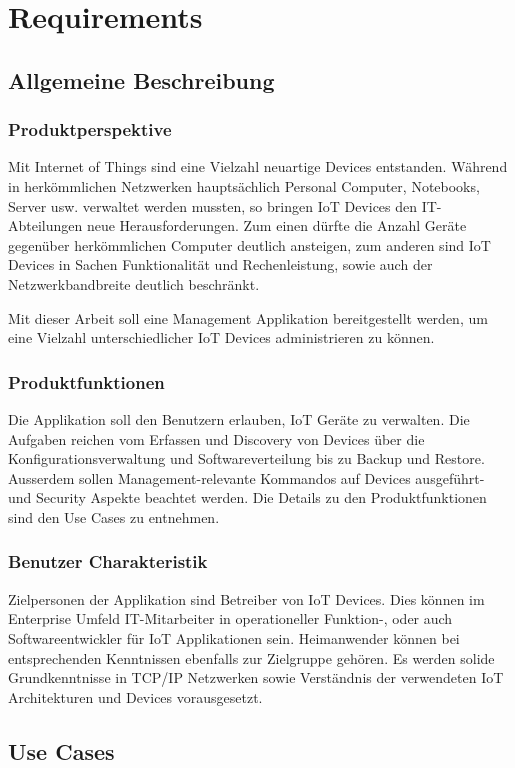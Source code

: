 \chapter{Requirements}
\section{Allgemeine Beschreibung}
\subsection{Produktperspektive}
Mit Internet of Things sind eine Vielzahl neuartige Devices entstanden. Während in herkömmlichen Netzwerken hauptsächlich Personal Computer, Notebooks, Server usw. verwaltet werden mussten, so bringen IoT Devices den IT-Abteilungen neue Herausforderungen. Zum einen dürfte die Anzahl Geräte gegenüber herkömmlichen Computer deutlich ansteigen, zum anderen sind IoT Devices in Sachen Funktionalität und Rechenleistung, sowie auch der Netzwerkbandbreite deutlich beschränkt. 

Mit dieser Arbeit soll eine Management Applikation bereitgestellt werden, um eine Vielzahl unterschiedlicher IoT Devices administrieren zu können. 
\subsection{Produktfunktionen}
Die Applikation soll den Benutzern erlauben, IoT Geräte zu verwalten. Die Aufgaben reichen vom Erfassen und Discovery von Devices über die Konfigurationsverwaltung und Softwareverteilung bis zu Backup und Restore. Ausserdem sollen Management-relevante Kommandos auf Devices ausgeführt- und Security Aspekte beachtet werden. Die Details zu den Produktfunktionen sind den Use Cases zu entnehmen.

\subsection{Benutzer Charakteristik}
Zielpersonen der Applikation sind Betreiber von IoT Devices. Dies können im Enterprise Umfeld IT-Mitarbeiter in operationeller Funktion-, oder auch Softwareentwickler für IoT Applikationen sein. Heimanwender können bei entsprechenden Kenntnissen ebenfalls zur Zielgruppe gehören. Es werden solide Grundkenntnisse in TCP/IP Netzwerken sowie Verständnis der verwendeten IoT Architekturen und Devices vorausgesetzt. 
\section{Use Cases}
